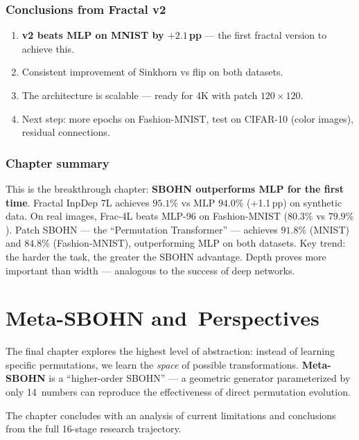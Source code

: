\documentclass[11pt,a4paper]{report}
\begin{document}
\subsection{Conclusions from Fractal v2}

\begin{enumerate}
\item \textbf{v2 beats MLP on MNIST by $+2.1$\,pp} --- the first fractal version to achieve this.
\item Consistent improvement of Sinkhorn vs flip on both datasets.
\item The architecture is scalable --- ready for 4K with patch $120{\times}120$.
\item Next step: more epochs on Fashion-MNIST, test on CIFAR-10 (color images), residual connections.
\end{enumerate}


\subsection*{Chapter summary}
This is the breakthrough chapter: \textbf{SBOHN outperforms MLP for the first time}. Fractal InpDep 7L achieves $95.1\%$ vs MLP $94.0\%$ (+1.1\,pp) on synthetic data. On real images, Frac-4L beats MLP-96 on Fashion-MNIST ($80.3\%$ vs $79.9\%$). Patch SBOHN --- the ``Permutation Transformer'' --- achieves $91.8\%$ (MNIST) and $84.8\%$ (Fashion-MNIST), outperforming MLP on both datasets. Key trend: the harder the task, the greater the SBOHN advantage. Depth proves more important than width --- analogous to the success of deep networks.

\newpage


\chapter{Meta-SBOHN and~Perspectives}

The final chapter explores the highest level of abstraction: instead of learning specific permutations, we learn the \emph{space} of possible transformations. \textbf{Meta-SBOHN} is a ``higher-order SBOHN'' --- a geometric generator parameterized by only 14~numbers can reproduce the effectiveness of direct permutation evolution.

The chapter concludes with an analysis of current limitations and conclusions from the full 16-stage research trajectory.
\end{document}
